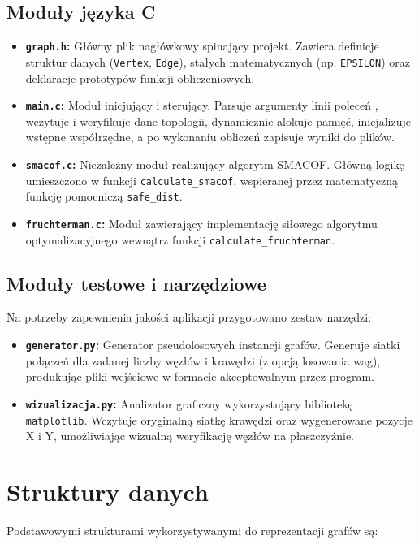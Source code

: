 \documentclass[12pt,a4paper]{article}
\begin{document}
\subsection{Moduły języka C}
\begin{itemize}
    \item \textbf{\texttt{graph.h}:} Główny plik nagłówkowy spinający projekt. Zawiera definicje struktur danych (\texttt{Vertex}, \texttt{Edge}), stałych matematycznych (np. \texttt{EPSILON}) oraz deklaracje prototypów funkcji obliczeniowych.
    
    \item \textbf{\texttt{main.c}:} Moduł inicjujący i sterujący. Parsuje argumenty linii poleceń , wczytuje i weryfikuje dane topologii, dynamicznie alokuje pamięć, inicjalizuje wstępne współrzędne, a po wykonaniu obliczeń zapisuje wyniki do plików.
    
    \item \textbf{\texttt{smacof.c}:} Niezależny moduł realizujący algorytm SMACOF. Główną logikę umieszczono w funkcji \texttt{calculate\_smacof}, wspieranej przez matematyczną funkcję pomocniczą \texttt{safe\_dist}.
    
    \item \textbf{\texttt{fruchterman.c}:} Moduł zawierający implementację siłowego algorytmu optymalizacyjnego wewnątrz funkcji \texttt{calculate\_fruchterman}.
\end{itemize}

\subsection{Moduły testowe i narzędziowe}
Na potrzeby zapewnienia jakości aplikacji przygotowano zestaw narzędzi:
\begin{itemize}
    \item \textbf{\texttt{generator.py}:} Generator pseudolosowych instancji grafów. Generuje siatki połączeń dla zadanej liczby węzłów i krawędzi (z opcją losowania wag), produkując pliki wejściowe w formacie akceptowalnym przez program.
    \item \textbf{\texttt{wizualizacja.py}:} Analizator graficzny wykorzystujący bibliotekę \texttt{matplotlib}. Wczytuje oryginalną siatkę krawędzi oraz wygenerowane pozycje X i Y, umożliwiając wizualną weryfikację węzłów na płaszczyźnie.
\end{itemize}

\section{Struktury danych}
Podstawowymi strukturami wykorzystywanymi do reprezentacji grafów są:
\end{document}
